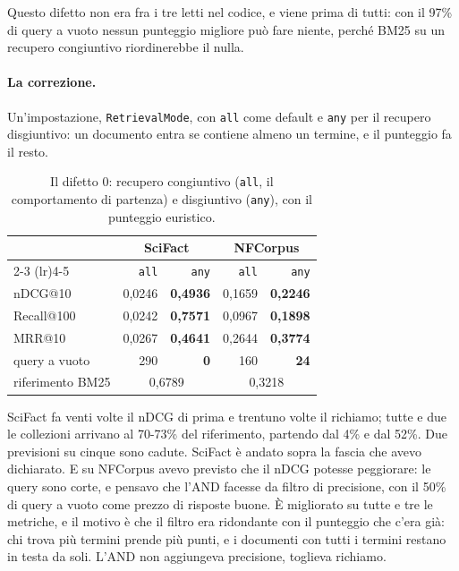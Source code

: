 Questo difetto non era fra i tre letti nel codice, e viene prima di tutti: con il
97\% di query a vuoto nessun punteggio migliore può fare niente, perché BM25 su un
recupero congiuntivo riordinerebbe il nulla.

\paragraph{La correzione.} Un'impostazione, \texttt{RetrievalMode}, con
\texttt{all} come default e \texttt{any} per il recupero disgiuntivo: un documento
entra se contiene almeno un termine, e il punteggio fa il resto.

\begin{table}[ht]
  \centering
  \begin{tabular}{lrrrr}
    \toprule
    & \multicolumn{2}{c}{SciFact} & \multicolumn{2}{c}{NFCorpus} \\
    \cmidrule(lr){2-3} \cmidrule(lr){4-5}
    & \texttt{all} & \texttt{any} & \texttt{all} & \texttt{any} \\
    \midrule
    nDCG@10 & 0,0246 & \textbf{0,4936} & 0,1659 & \textbf{0,2246} \\
    Recall@100 & 0,0242 & \textbf{0,7571} & 0,0967 & \textbf{0,1898} \\
    MRR@10 & 0,0267 & \textbf{0,4641} & 0,2644 & \textbf{0,3774} \\
    query a vuoto & 290 & \textbf{0} & 160 & \textbf{24} \\
    \midrule
    riferimento BM25 & \multicolumn{2}{c}{0,6789} & \multicolumn{2}{c}{0,3218} \\
    \bottomrule
  \end{tabular}
  \caption{Il difetto 0: recupero congiuntivo (\texttt{all}, il comportamento di
  partenza) e disgiuntivo (\texttt{any}), con il punteggio euristico.}
  \label{tab:difetto0}
\end{table}

SciFact fa venti volte il nDCG di prima e trentuno volte il richiamo; tutte e due
le collezioni arrivano al 70-73\% del riferimento, partendo dal 4\% e dal 52\%.
Due previsioni su cinque sono cadute. SciFact è andato sopra la fascia che avevo
dichiarato. E su NFCorpus avevo previsto che il nDCG potesse peggiorare: le query
sono corte, e pensavo che l'AND facesse da filtro di precisione, con il 50\% di
query a vuoto come prezzo di risposte buone. È migliorato su tutte e tre le
metriche, e il motivo è che il filtro era ridondante con il punteggio che c'era
già: chi trova più termini prende più punti, e i documenti con tutti i termini
restano in testa da soli. L'AND non aggiungeva precisione, toglieva richiamo.

